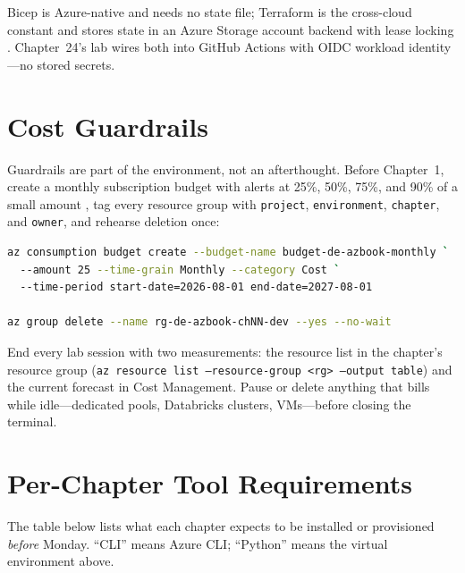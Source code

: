 Bicep is Azure-native and needs no state file; Terraform is the cross-cloud constant and stores
state in an Azure Storage account backend with lease locking \cite{microsoft2025bicep,hashicorp2025azurerm}.
Chapter~24's lab wires both into GitHub Actions with OIDC workload identity---no stored secrets.

\section{Cost Guardrails}
%
Guardrails are part of the environment, not an afterthought. Before Chapter~1, create a monthly
subscription budget with alerts at 25\%, 50\%, 75\%, and 90\% of a small amount
\cite{microsoft2025costBudgets}, tag every resource group with
\texttt{project}, \texttt{environment}, \texttt{chapter}, and \texttt{owner}, and rehearse
deletion once:

\begin{lstlisting}[language=bash,caption={The budget-and-cleanup habit every chapter assumes.},label={lst:appenv-budget}]
az consumption budget create --budget-name budget-de-azbook-monthly `
  --amount 25 --time-grain Monthly --category Cost `
  --time-period start-date=2026-08-01 end-date=2027-08-01

az group delete --name rg-de-azbook-chNN-dev --yes --no-wait
\end{lstlisting}

\begin{tipbox}
End every lab session with two measurements: the resource list in the chapter's resource group
(\texttt{az resource list --resource-group <rg> --output table}) and the current forecast in Cost
Management. Pause or delete anything that bills while idle---dedicated pools, Databricks clusters,
VMs---before closing the terminal.
\end{tipbox}

\section{Per-Chapter Tool Requirements}
%
The table below lists what each chapter expects to be installed or provisioned \emph{before}
Monday. ``CLI'' means Azure CLI; ``Python'' means the virtual environment above.

